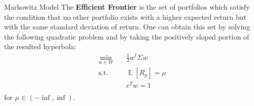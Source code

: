 \documentclass[aspectratio=169]{beamer}
\begin{document}
	
\begin{frame}{Markowitz Model}
The \textbf{Efficient Frontier} is the set of portfolios which satisfy the condition that no other portfolio exists with a higher expected return but with the same standard deviation of return. One can obtain this set by solving the following quadratic problem and by taking the positively sloped portion of the resulted hyperbola:
    \begin{equation}
        \begin{aligned}
        \min_{w \in \mathcal{W}} \quad & \frac{1}{2}w^t \Sigma w\\
        \textrm{s.t.} \quad & \mathop{\mathbb{E}}\left[ R_p  \right] = \mu\\
        & e^T w = 1    \\
        \end{aligned}
    \end{equation}
for $\mu \in \left( -\inf, \inf \right)$.
\end{frame}
\end{document}
